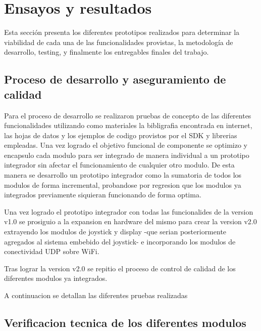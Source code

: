 
\chapter{Ensayos y resultados} %

\label{Chapter4} %

Esta sección presenta los diferentes prototipos realizados para determinar la viabilidad de cada una de las funcionalidades provistas, la metodología de desarrollo, testing, y finalmente los entregables finales del trabajo.

\section{Proceso de desarrollo y aseguramiento de calidad}
\label{sec:pruebasHW}

Para el proceso de desarrollo se realizaron pruebas de concepto de las diferentes funcionalidades utilizando como materiales la bibligrafia encontrada en internet, las hojas de datos y los ejemplos de codigo provistos por el SDK y librerias empleadas. Una vez logrado el objetivo funcional de componente se optimizo y encapsulo cada modulo para ser integrado de manera individual a un prototipo integrador sin afectar el funcionamiento de cualquier otro modulo.
De esta manera se desarrollo un prototipo integrador como la sumatoria de todos los modulos de forma incremental, probandose por regresion que los modulos ya integrados previamente siquieran funcionando de forma optima.

Una vez logrado el prototipo integrador con todas las funcionalides de la version v1.0 se prosiguio a la expansion en hardware del mismo para crear la version v2.0 extrayendo los modulos de joystick y display -que serian posteriormente agregados al sistema embebido del joystick- e incorporando los modulos de conectividad UDP sobre WiFi.

Tras lograr la version v2.0 se repitio el proceso de control de calidad de los diferentes modulos ya integrados.

A continuacion se detallan las diferentes pruebas realizadas 

\section{Verificacion tecnica de los diferentes modulos}


